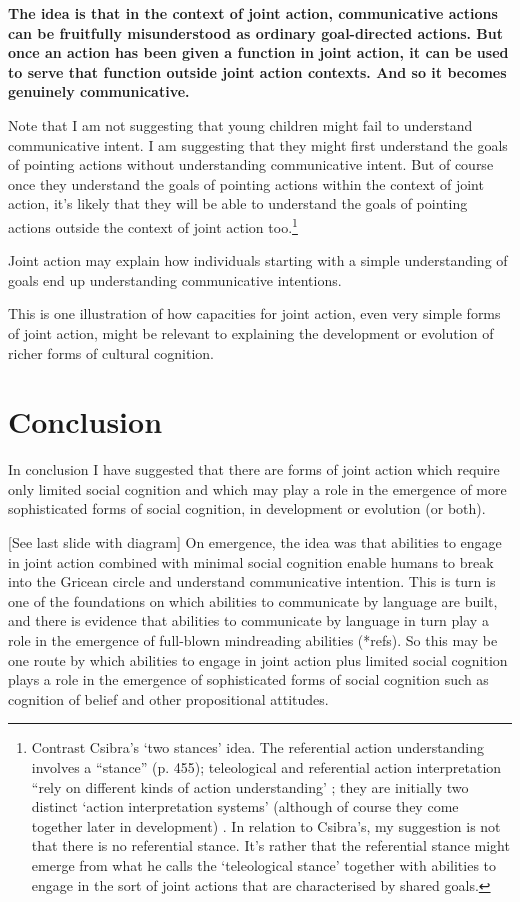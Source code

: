 \documentclass[12pt,a4paper]{extarticle}
\begin{document}
\textbf{
The idea is that in the context of joint action, communicative actions can be fruitfully misunderstood as ordinary goal-directed actions.
But once an action has been given a function in joint action, it can be used to serve that function outside joint action contexts.  And so it becomes genuinely communicative.
}

Note that I am not suggesting that young children might fail to understand communicative intent.
I am suggesting that they might first understand the goals of pointing actions without understanding communicative intent.
But of course once they understand the goals of pointing actions within the context of joint action, it's likely that they will be able to understand the goals of pointing actions outside the context of joint action too.\footnote{
Contrast Csibra's `two stances' idea. The referential action understanding involves a “stance” (p. 455); teleological and referential action interpretation “rely on different kinds of action understanding' \citep[p.\ 456]{Csibra:2003kp}; they are initially two distinct `action interpretation systems' (although of course they come together later in development)  \citep[p.\ 456]{Csibra:2003kp}.
In relation to Csibra's, my suggestion is not that there is no referential stance.
It's rather that the referential stance might emerge from what he calls the `teleological stance' together with abilities to engage in the sort of joint actions that are characterised by shared goals.
}

Joint action may explain how individuals starting with a simple understanding of goals end up understanding communicative intentions.

This is one illustration of how capacities for joint action, even very simple forms of joint action, might be relevant to explaining the development or evolution of richer forms of cultural cognition.



\section{Conclusion}
In conclusion I have suggested that there are forms of joint action which require only limited social cognition and which may play a role in the emergence of more sophisticated forms of social cognition, in development or evolution (or both).

[See last slide with diagram] On emergence, the idea was that abilities to engage in joint action combined with minimal social cognition enable humans to break into the Gricean circle and understand communicative intention.
This is turn is one of the foundations on which abilities to communicate by language are built,
and there is evidence that abilities to communicate by language in turn play a role in the emergence of full-blown mindreading abilities (*refs).
So this may be one route by which abilities to engage in joint action plus limited social cognition plays a role in the emergence of sophisticated forms of social cognition such as cognition of belief and other propositional attitudes.








\end{document}
